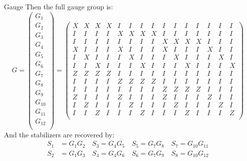 \documentclass{beamer}
\begin{document}
\begin{frame}{Gauge}
    Then the full gauge group is:
    \footnotesize
    \[G = 
    \begin{pmatrix}
    G_1 \\ G_2 \\ G_3 \\ G_4 \\ G_5 \\ G_6 \\ G_7 \\ G_8 \\ G_9 \\ G_{10} \\ G_{11} \\ G_{12} \\
    \end{pmatrix}
    =
    \begin{pmatrix}
    X & X & X & X & I & I & I & I & I & I & I & I & I & I & I \\
    I & I & I & I & X & X & X & X & I & I & I & I & I & I & I \\
    I & I & I & I & I & I & I & I & X & X & X & X & I & I & I \\
    X & I & I & I & X & I & I & I & X & I & I & I & X & I & I \\
    I & X & I & I & I & X & I & I & I & X & I & I & I & X & I \\
    I & I & X & I & I & I & X & I & I & I & X & I & I & I & X \\
    Z & Z & Z & Z & I & I & I & I & I & I & I & I & I & I & I \\
    I & I & I & I & Z & Z & Z & Z & I & I & I & I & I & I & I \\
    I & I & I & I & I & I & I & I & Z & Z & Z & Z & I & I & I \\
    Z & I & I & I & Z & I & I & I & Z & I & I & I & Z & I & I \\
    I & Z & I & I & I & Z & I & I & I & Z & I & I & I & Z & I \\
    I & I & Z & I & I & I & Z & I & I & I & Z & I & I & I & Z \\
    \end{pmatrix}\]
    \normalsize
    And the stabilizers are recovered by:
    \begin{align*}
        S_1 &= G_1G_2 \quad S_3 = G_4G_5 \quad S_5 = G_7G_8 \quad S_7 = G_{10}G_{11} \\
        S_2 &= G_1G_3 \quad S_4 = G_4G_6 \quad S_6 = G_7G_9 \quad S_8 = G_{10}G_{12}
    \end{align*}
\end{frame}
\end{document}
